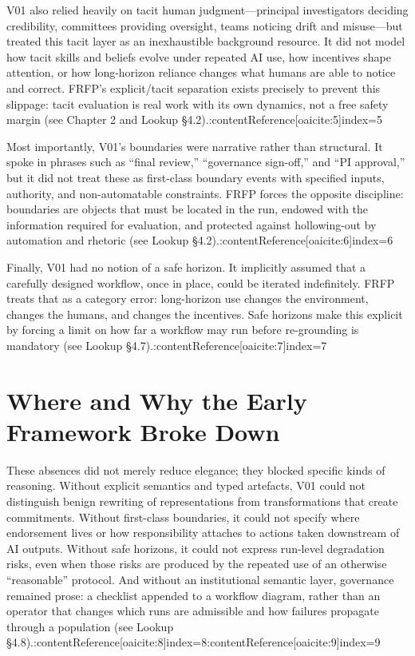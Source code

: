 V01 also relied heavily on tacit human judgment---principal investigators deciding credibility, committees providing oversight, teams noticing drift and misuse---but treated this tacit layer as an inexhaustible background resource. It did not model how tacit skills and beliefs evolve under repeated AI use, how incentives shape attention, or how long-horizon reliance changes what humans are able to notice and correct. FRFP’s explicit/tacit separation exists precisely to prevent this slippage: tacit evaluation is real work with its own dynamics, not a free safety margin (see Chapter 2 and Lookup \S4.2).:contentReference[oaicite:5]{index=5}

Most importantly, V01’s boundaries were narrative rather than structural. It spoke in phrases such as ``final review,'' ``governance sign-off,'' and ``PI approval,'' but it did not treat these as first-class boundary events with specified inputs, authority, and non-automatable constraints. FRFP forces the opposite discipline: boundaries are objects that must be located in the run, endowed with the information required for evaluation, and protected against hollowing-out by automation and rhetoric (see Lookup \S4.2).:contentReference[oaicite:6]{index=6}

Finally, V01 had no notion of a safe horizon. It implicitly assumed that a carefully designed workflow, once in place, could be iterated indefinitely. FRFP treats that as a category error: long-horizon use changes the environment, changes the humans, and changes the incentives. Safe horizons make this explicit by forcing a limit on how far a workflow may run before re-grounding is mandatory (see Lookup \S4.7).:contentReference[oaicite:7]{index=7}

\section{Where and Why the Early Framework Broke Down}

These absences did not merely reduce elegance; they blocked specific kinds of reasoning. Without explicit semantics and typed artefacts, V01 could not distinguish benign rewriting of representations from transformations that create commitments. Without first-class boundaries, it could not specify where endorsement lives or how responsibility attaches to actions taken downstream of AI outputs. Without safe horizons, it could not express run-level degradation risks, even when those risks are produced by the repeated use of an otherwise ``reasonable'' protocol. And without an institutional semantic layer, governance remained prose: a checklist appended to a workflow diagram, rather than an operator that changes which runs are admissible and how failures propagate through a population (see Lookup \S4.8).:contentReference[oaicite:8]{index=8}:contentReference[oaicite:9]{index=9}

